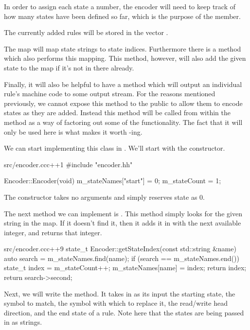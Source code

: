 In order to assign each state a number, the encoder will need to keep track of how many states have been defined so far, which is the purpose of the  member.

The currently added rules will be stored in the vector .

The map  will map state strings to state indices. Furthermore there is a method  which also performs this mapping. This method, however, will also add the given state to the map if it's not in there already.

Finally, it will also be helpful to have a method  which will output an individual rule's machine code to some output stream. For the reasons mentioned previously, we cannot expose this method to the public to allow them to encode states as they are added. Instead this method will be called from within the   method as a way of factoring out some of the functionality. The fact that it will only be used here is what makes it worth -ing.

We can start implementing this class in . We'll start with the constructor.

\begin{file}{src/encoder.cc}{c++}{1}
#include "encoder.hh"

Encoder::Encoder(void)
{
	m_stateNames["start"] = 0;
	m_stateCount = 1;
}
\end{file}

The constructor takes no arguments and simply reserves state  as 0.

The next method we can implement is . This method simply looks for the given string in the  map. If it doesn't find it, then it adds it in with the next available integer, and returns that integer.

\begin{file}{src/encoder.cc}{c++}{9}
state_t Encoder::getStateIndex(const std::string &name)
{
    auto search = m_stateNames.find(name);
    if (search == m_stateNames.end())
    {
        state_t index = m_stateCount++;
        m_stateNames[name] = index;
        return index;
    }
    return search->second;
}
\end{file}

Next, we will write the  method. It takes in as its input the starting state, the symbol to match, the symbol with which to replace it, the read/write head direction, and the end state of a rule. Note here that the states are being passed in as strings.

